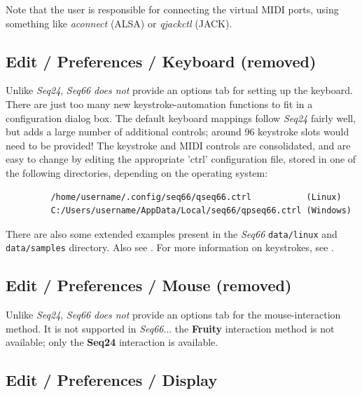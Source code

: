    Note that the user is responsible for connecting the virtual MIDI ports,
   using something like \textsl{aconnect} (ALSA) or
   \textsl{qjackctl} (JACK).

\subsection{Edit / Preferences / Keyboard (removed)}
\label{subsection:edit_preferences_keyboard}

   Unlike \textsl{Seq24}, \textsl{Seq66}
   \textsl{does not} provide an options tab for
   setting up the keyboard.
   There are just too many new keystroke-automation functions to fit
   in a configuration dialog box.
   The default keyboard mappings follow \textsl{Seq24} fairly well,
   but adds a large number of additional controls;
   around 96 keystroke slots would need to be provided!
   The keystroke and MIDI controls are consolidated, and are easy to change by
   editing the appropriate 'ctrl' configuration file, stored in one of the
   following directories, depending on
   the operating system:
   
   \begin{verbatim}
         /home/username/.config/seq66/qseq66.ctrl           (Linux)
         C:/Users/username/AppData/Local/seq66/qpseq66.ctrl (Windows)
   \end{verbatim}

   There are also some extended examples present in the \textsl{Seq66}
   \texttt{data/linux} and
   \texttt{data/samples} directory.
   Also see .
   For more information on keystrokes, see
   .

\subsection{Edit / Preferences / Mouse (removed)}
\label{subsection:edit_preferences_mouse}

   Unlike \textsl{Seq24}, \textsl{Seq66}
   \textsl{does not} provide an options tab for
   the mouse-interaction method.
   It is not supported in \textsl{Seq66}...
   the \textbf{Fruity} interaction method is not available;
   only the \textbf{Seq24} interaction is available.
 
\subsection{Edit / Preferences / Display}
\label{subsection:edit_preferences_display}

